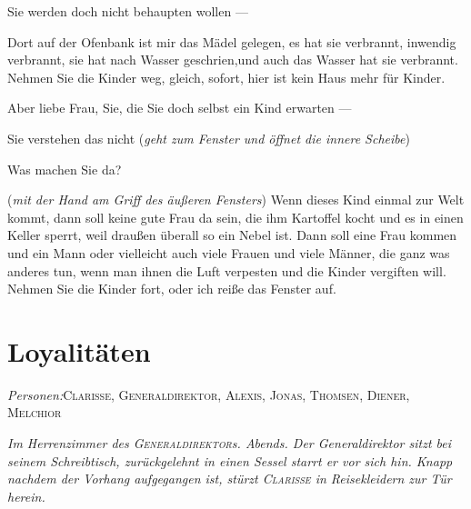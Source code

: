 \documentclass[
	final,
	a4paper,
	ngerman,
	mpinclude = true, %
	twoside = true,
	open = right,
	cleardoublepage = plain,
	DIV = 13,
	BCOR = 1cm,
	titlepage = firstiscover,
	]{scrbook}
\newcommand{\scene}{\setcounter{subscene}{1}\section}
\newcommand{\direction}[1]{(\textit{#1})}
\newcommand{\setting}[1]{\vspace{-0.5\baselineskip}\centering\textit{#1}}
\newcounter{subscene}
\newcommand{\characterlist}[1]{{\begin{center}\textit{Personen:}\quad{}#1\end{center}}}
\newcommand{\thecharacter}[1]{\textup{\textsc{#1}}\xspace}
\newcommand{\theBarbara}{\thecharacter{Barbara}}
\newcommand{\theGeneraldirektor}{\thecharacter{Generaldirektor}}
\newcommand{\theClarisse}{\thecharacter{Clarisse}}
\newcommand{\theAlexis}{\thecharacter{Alexis}}
\newcommand{\theThomsen}{\thecharacter{Thomsen}}
\newcommand{\theJonas}{\thecharacter{Jonas}}
\newcommand{\theMelchior}{\thecharacter{Melchior}}
\newcommand{\theDiener}{\thecharacter{Diener}}
\newcommand{\character}[1]{\item[#1]}
\newcommand{\Barbara}{\character{\theBarbara}}
\newcommand{\Generaldirektor}{\character{Direktor}}
\begin{document}
\begin{play}
\Generaldirektor
Sie werden doch nicht behaupten wollen ---

\Barbara
Dort auf der Ofenbank ist mir das Mädel gelegen, es hat sie verbrannt, inwendig verbrannt, sie hat nach Wasser geschrien,und auch das Wasser hat sie verbrannt. Nehmen Sie die Kinder weg, gleich, sofort, hier ist kein Haus mehr für Kinder.

\Generaldirektor
Aber liebe Frau, Sie, die Sie doch selbst ein Kind erwarten ---

\Barbara
Sie verstehen das nicht \direction{geht zum Fenster und öffnet die innere Scheibe}

\Generaldirektor
Was machen Sie da?

\Barbara
\direction{mit der Hand am Griff des äußeren Fensters} Wenn dieses Kind einmal zur Welt kommt, dann soll keine gute Frau da sein, die ihm Kartoffel kocht und es in einen Keller sperrt, weil draußen überall so ein Nebel ist. Dann soll eine Frau kommen und ein Mann oder vielleicht auch viele Frauen und viele Männer, die ganz was anderes tun, wenn man ihnen die Luft verpesten und die Kinder vergiften will. Nehmen Sie die Kinder fort, oder ich reiße das Fenster auf.
\end{play}



\scene{Loyalitäten}
\label{scene:V}
\characterlist{\theClarisse, \theGeneraldirektor, \theAlexis, \theJonas, \theThomsen, \theDiener, \theMelchior}
\setting{Im Herrenzimmer des \theGeneraldirektor{}s. Abends. Der Generaldirektor sitzt bei seinem Schreibtisch, zurückgelehnt in einen Sessel starrt er vor sich hin. Knapp nachdem der Vorhang aufgegangen ist, stürzt \theClarisse in Reisekleidern zur Tür herein.}
\end{document}
